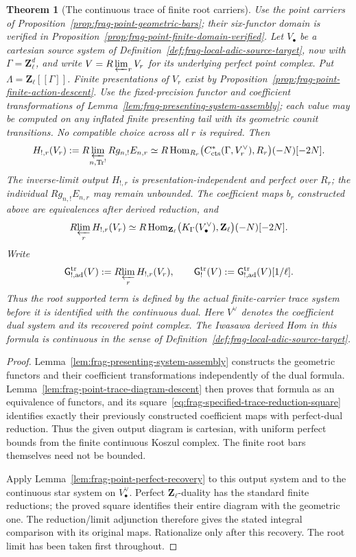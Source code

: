 \documentclass[11pt]{article}
\newtheorem{theorem}{Theorem}[section]
\theoremstyle{definition}
\theoremstyle{remark}
\begin{document}
\begin{theorem}[The continuous trace of finite root carriers]
\label{thm:frag-point-C1}
Use the point carriers of Proposition~\ref{prop:frag-point-geometric-bars};
their six-functor domain is verified in
Proposition~\ref{prop:frag-point-finite-domain-verified}.  Let $V_\bullet$ be a
cartesian source system of Definition~\ref{def:frag-local-adic-source-target},
now with $\Gamma=\mathbf Z_\ell^d$, and write
$V=R\varprojlim_rV_r$ for its underlying perfect point complex.
Put $\Lambda=\mathbf Z_\ell[[\Gamma]]$.  Finite presentations of $V_r$
exist by Proposition~\ref{prop:frag-point-finite-action-descent}.
Use the fixed-precision functor and coefficient transformations of
Lemma~\ref{lem:frag-presenting-system-assembly}; each value may be
computed on any inflated finite presenting tail with its geometric
counit transitions.  No compatible choice across all $r$ is required.
Then
\[
 H_{!,r}(V_r):=R\!\varprojlim_{n,\operatorname{Tr}^!}Rg_{n,!}E_{n,r}
 \simeq
 R\operatorname{Hom}_{R_r}
 \bigl(C^*_{\mathrm{cts}}(\Gamma,V_r^\vee),R_r\bigr)(-N)[-2N].
\]
The inverse-limit output $H_{!,r}$ is presentation-independent
and perfect over $R_r$; the individual $Rg_{n,!}E_{n,r}$ may remain
unbounded.  The coefficient maps $b_r$ constructed above are
equivalences after derived reduction, and
\[
 R\!\varprojlim_r H_{!,r}(V_r)
 \simeq R\operatorname{Hom}_{\mathbf Z_\ell}
 \bigl(K_\Gamma(V_\bullet^\vee),\mathbf Z_\ell\bigr)(-N)[-2N].
\]
Write
\[
 \mathsf G_{!,\mathrm{ad}}^{\mathrm{tr}}(V)
 :=R\!\varprojlim_rH_{!,r}(V_r),\qquad
 \mathsf G_!^{\mathrm{tr}}(V)
 :=\mathsf G_{!,\mathrm{ad}}^{\mathrm{tr}}(V)[1/\ell].
\]
Thus the root supported term is defined by the actual finite-carrier
trace system before it is identified with the continuous dual.
Here $V^\vee$ denotes the coefficient dual system and its recovered
point complex.  The Iwasawa derived Hom in this formula is continuous
in the sense of Definition~\ref{def:frag-local-adic-source-target}.
\end{theorem}

\begin{proof}
Lemma~\ref{lem:frag-presenting-system-assembly} constructs the
geometric functors and their coefficient transformations independently
of the dual formula.  Lemma~\ref{lem:frag-point-trace-diagram-descent}
then proves that formula as an equivalence of functors, and its
square~\eqref{eq:frag-specified-trace-reduction-square} identifies
exactly their previously constructed coefficient maps with perfect-dual
reduction.  Thus the given output diagram is cartesian, with uniform
perfect bounds from the finite continuous Koszul complex.  The finite
root bars themselves need not be bounded.

Apply Lemma~\ref{lem:frag-point-perfect-recovery} to this output
system and to the continuous star system on $V_\bullet^\vee$.
Perfect $\mathbf Z_\ell$-duality has the standard finite reductions;
the proved square identifies their entire diagram with the geometric
one.  The reduction/limit adjunction therefore gives the stated
integral comparison with its original maps.  Rationalize only after
this recovery.  The root limit has been taken first throughout.
\end{proof}
\end{document}
